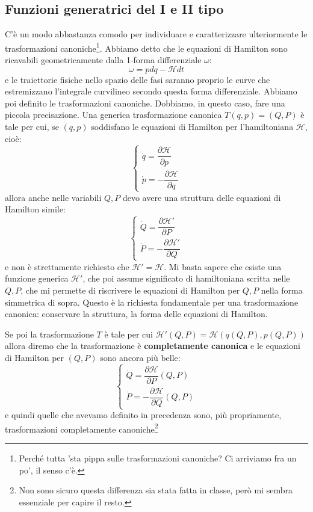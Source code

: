 \documentclass[a4paper,openany]{article}
\begin{document}
\subsection{Funzioni generatrici del I e II tipo}
C'è un modo abbastanza comodo per individuare e caratterizzare ulteriormente le trasformazioni canoniche\footnote{Perché tutta 'sta pippa sulle trasformazioni canoniche? Ci arriviamo fra un po', il senso c'è.}. Abbiamo detto che le equazioni di Hamilton sono ricavabili geometricamente dalla 1-forma differenziale $\omega$:
$$
\omega = pdq-\mathcal{H}dt
$$
e le traiettorie fisiche nello spazio delle fasi saranno proprio le curve che estremizzano l'integrale curvilineo secondo questa forma differenziale. Abbiamo poi definito le trasformazioni canoniche. Dobbiamo, in questo caso, fare una piccola precisazione. Una generica trasformazione canonica $T(q,p) = (Q,P)$ è tale per cui, se $(q,p)$ soddisfano le equazioni di Hamilton per l'hamiltoniana $\mathcal{H}$, cioè:
\begin{equation}\label{key}
	\begin{cases}
		\dot{q} = \dfrac{\partial \mathcal{H}}{\partial p} \\
		\dot{p} = -\dfrac{\partial \mathcal{H}}{\partial q}
	\end{cases}
\end{equation}
allora anche nelle variabili $Q,P$ devo avere una struttura delle equazioni di Hamilton simile:
\begin{equation}\label{key}
	\begin{cases}
		\dot{Q} = \dfrac{\partial \mathcal{H}'}{\partial P} \\
		\dot{P} = -\dfrac{\partial \mathcal{H}'}{\partial Q}
	\end{cases}
\end{equation}
e non è strettamente richiesto che $\mathcal{H}' = \mathcal{H}$. Mi basta sapere che esiste una funzione generica $\mathcal{H}'$, che poi assume significato di hamiltoniana scritta nelle $Q,P$, che mi permette di riscrivere le equazioni di Hamilton per $Q,P$ nella forma simmetrica di sopra. Questo è la richiesta fondamentale per una trasformazione canonica: conservare la struttura, la forma delle equazioni di Hamilton. 

Se poi la trasformazione $T$ è tale per cui $\mathcal{H}'(Q,P) = \mathcal{H}(q(Q,P),p(Q,P))$ allora diremo che la trasformazione è \textbf{completamente canonica} e le equazioni di Hamilton per $(Q,P)$ sono ancora più belle:
\begin{equation}\label{key}
	\begin{cases}
		\dot{Q} = \dfrac{\partial \mathcal{H}}{\partial P}(Q,P) \\
		\dot{P} = -\dfrac{\partial \mathcal{H}}{\partial Q}(Q,P)
	\end{cases}
\end{equation}
e quindi quelle che avevamo definito in precedenza sono, più propriamente, trasformazioni completamente canoniche\footnote{Non sono sicuro questa differenza sia stata fatta in classe, però mi sembra essenziale per capire il resto.}
\end{document}
